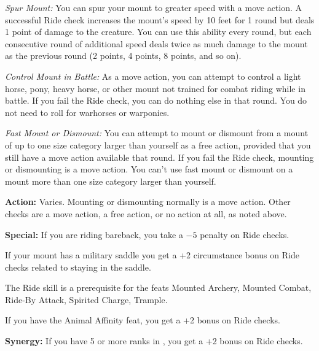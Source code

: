 \textit{Spur Mount:} You can spur your mount to greater speed with a move action. A successful Ride check increases the mount’s speed by 10 feet for 1 round but deals 1 point of damage to the creature. You can use this ability every round, but each consecutive round of additional speed deals twice as much damage to the mount as the previous round (2 points, 4 points, 8 points, and so on).

\textit{Control Mount in Battle:} As a move action, you can attempt to control a light horse, pony, heavy horse, or other mount not trained for combat riding while in battle. If you fail the Ride check, you can do nothing else in that round. You do not need to roll for warhorses or warponies.

\textit{Fast Mount or Dismount:} You can attempt to mount or dismount from a mount of up to one size category larger than yourself as a free action, provided that you still have a move action available that round. If you fail the Ride check, mounting or dismounting is a move action. You can’t use fast mount or dismount on a mount more than one size category larger than yourself.

\textbf{Action:} Varies. Mounting or dismounting normally is a move action. Other checks are a move action, a free action, or no action at all, as noted above.

\textbf{Special:} If you are riding bareback, you take a $-5$ penalty on Ride checks.

If your mount has a military saddle you get a +2 circumstance bonus on Ride checks related to staying in the saddle.

The Ride skill is a prerequisite for the feats Mounted Archery, Mounted Combat, Ride-By Attack, Spirited Charge, Trample.

If you have the Animal Affinity feat, you get a +2 bonus on Ride checks.

\textbf{Synergy:} If you have 5 or more ranks in , you get a +2 bonus on Ride checks.

